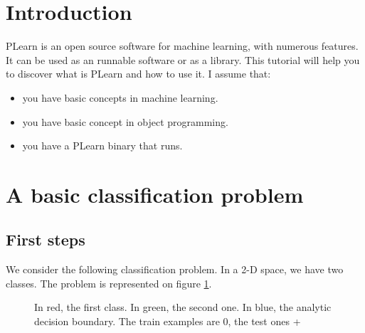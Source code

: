 
\section{Introduction}


PLearn is an open source software for machine learning, with numerous features.
It can be used as an runnable software or as a library. This tutorial will help 
you to discover what is PLearn and how to use it.
I assume that:
\begin{itemize}
\item you have basic concepts in machine learning.
\item you have basic concept in object programming.
\item you have a PLearn binary that runs.
\end{itemize}

\section{A basic classification problem}

\subsection{First steps}
We consider the following classification problem. In a 2-D space, we have two 
classes. The problem is represented on figure \ref{classpb}. 

\begin{figure}
  \caption{In red, the first class. In green, the second one. In blue, the 
analytic decision boundary. The train examples are 0, the test ones +}  
\label{classpb}
\end{figure}

